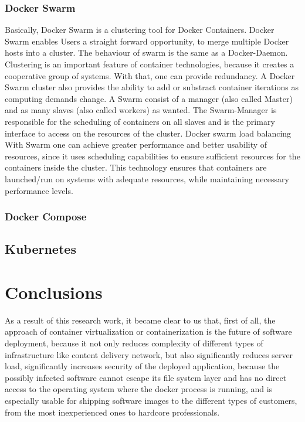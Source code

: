 \subsubsection{Docker Swarm}

Basically, Docker Swarm is a clustering tool for Docker Containers.
Docker Swarm enables Users a straight forward opportunity,
to merge multiple Docker hosts into a cluster.
The behaviour of swarm is the same as a Docker-Daemon.
Clustering is an important feature of container technologies,
because it creates a cooperative group of systems.
With that, one can provide redundancy. A Docker Swarm cluster also provides the
ability to add or substract container iterations as computing demands change.
A Swarm consist of a manager (also called Master) and
as many slaves (also called workers) as wanted.
The Swarm-Manager is responsible for the scheduling
of containers on all slaves and is the primary
interface to access on the resources of the cluster.
Docker swarm load balancing
With Swarm one can achieve greater performance and
better usability of resources, since it uses
scheduling capabilities to ensure sufficient resources for
the containers inside the cluster. This technology ensures that containers
are launched/run on systems with adequate resources, while maintaining
necessary performance levels.

\subsubsection{Docker Compose}

\subsection{Kubernetes}

\section{Conclusions}

As a result of this research work, it became clear to us that, first of all,
the approach of container virtualization or containerization
is the future of software deployment, because it not only reduces complexity of
different types of infrastructure like content delivery network,
but also significantly reduces server load, significantly
increases security of the deployed application,
because the possibly infected software cannot
escape its file system layer and has no direct access
to the operating system where the docker process is running, and is
especially usable for shipping software images to the different types of customers,
from the most inexperienced ones to hardcore professionals.

